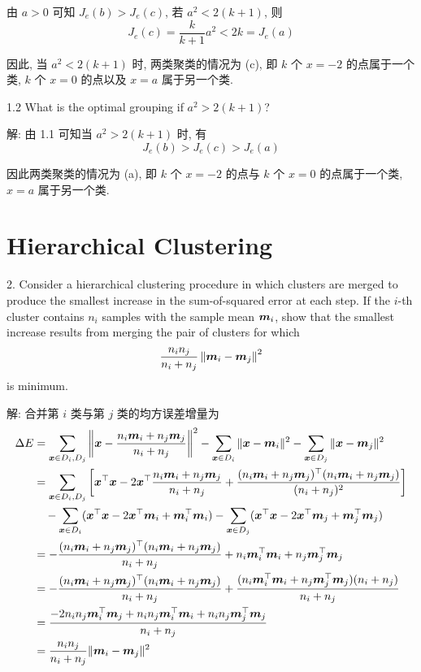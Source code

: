 \documentclass{article}
\begin{document}
由 $a>0$ 可知 $J_e(b)>J_e(c)$, 若 $a^2<2(k+1)$, 则
\begin{equation}
  J_e(c)=\frac{k}{k+1}a^2<2k=J_e(a)
\end{equation}

因此, 当 $a^2<2(k+1)$ 时, 两类聚类的情况为 (c), 即 $k$ 个 $x=-2$ 的点属于一个类, $k$ 个 $x=0$ 的点以及 $x=a$ 属于另一个类.

1.2 What is the optimal grouping if $a^2>2(k+1)$?

解: 由 1.1 可知当 $a^2>2(k+1)$ 时, 有
\begin{equation}
  J_e(b)>J_e(c)>J_e(a)
\end{equation} 

因此两类聚类的情况为 (a), 即 $k$ 个 $x=-2$ 的点与 $k$ 个 $x=0$ 的点属于一个类, $x=a$ 属于另一个类.

\section*{Hierarchical Clustering}

2. Consider a hierarchical clustering procedure in which clusters are merged to produce the smallest increase in the sum-of-squared error at each step. If the $i$-th cluster contains $n_i$ samples with the sample mean $\bm{m}_i$, show that the smallest increase results from merging the pair of clusters for which
\begin{equation}
  \frac{n_i n_j}{n_i+n_j}\left\|\bm{m}_i-\bm{m}_j\right\|^2
\end{equation}
is minimum.

解: 合并第 $i$ 类与第 $j$ 类的均方误差增量为
\begin{equation}
  \begin{aligned}
    \Delta E
    &=\sum_{\bm{x}\in D_i,D_j}\left\|\bm{x}-\frac{n_i\bm{m}_i+n_j\bm{m}_j}{n_i+n_j}\right\|^2-\sum_{\bm{x}\in D_i}\|\bm{x}-\bm{m}_i\|^2-\sum_{\bm{x}\in D_j}\|\bm{x}-\bm{m}_j\|^2\\
    &=\sum_{\bm{x}\in D_i,D_j}\left[\bm{x}^\top\bm{x}-2\bm{x}^\top\frac{n_i\bm{m}_i+n_j\bm{m}_j}{n_i+n_j}+\frac{(n_i\bm{m}_i+n_j\bm{m}_j)^\top(n_i\bm{m}_i+n_j\bm{m}_j)}{(n_i+n_j)^2}\right]\\
    &\quad-\sum_{\bm{x}\in D_i}(\bm{x}^\top\bm{x}-2\bm{x}^\top\bm{m}_i+\bm{m}_i^\top\bm{m}_i)-\sum_{\bm{x}\in D_j}(\bm{x}^\top\bm{x}-2\bm{x}^\top\bm{m}_j+\bm{m}_j^\top\bm{m}_j)\\
    &=-\frac{(n_i\bm{m}_i+n_j\bm{m}_j)^\top(n_i\bm{m}_i+n_j\bm{m}_j)}{n_i+n_j}+n_i\bm{m}_i^\top\bm{m}_i+n_j\bm{m}_j^\top\bm{m}_j\\
    &=-\frac{(n_i\bm{m}_i+n_j\bm{m}_j)^\top(n_i\bm{m}_i+n_j\bm{m}_j)}{n_i+n_j}+\frac{(n_i\bm{m}_i^\top\bm{m}_i+n_j\bm{m}_j^\top\bm{m}_j)(n_i+n_j)}{n_i+n_j}\\
    &=\frac{-2n_in_j\bm{m}_i^\top\bm{m}_j+n_in_j\bm{m}_i^\top\bm{m}_i+n_in_j\bm{m}_j^\top\bm{m}_j}{n_i+n_j}\\
    &=\frac{n_in_j}{n_i+n_j}\|\bm{m}_i-\bm{m}_j\|^2
  \end{aligned}
\end{equation}
\end{document}
